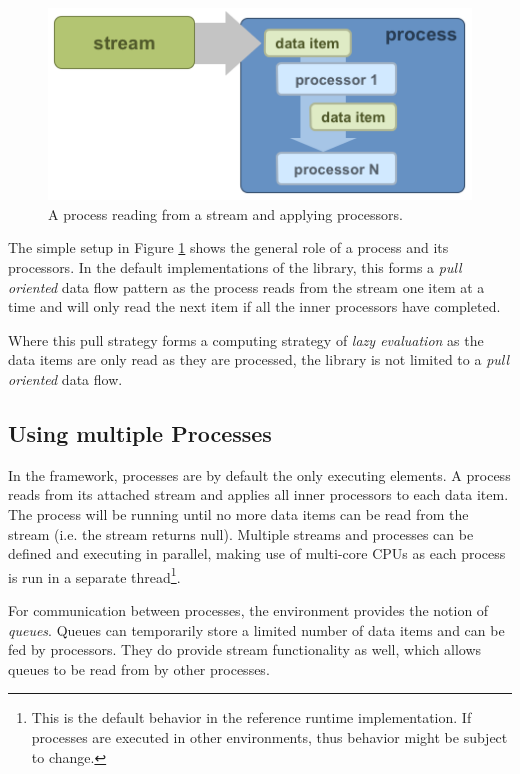 \begin{figure}[h!]
\centering
\includegraphics[scale=0.5]{graphics/inside-process.png}
\caption{\label{fig:process}A process reading from a stream and applying processors.}
\end{figure}

The simple setup in Figure \ref{fig:process} shows the general role of
a process and its processors. In the default implementations of the
\streams library, this forms a {\em pull oriented} data flow pattern
as the process reads from the stream one item at a time and will only
read the next item if all the inner processors have completed. 

Where this pull strategy forms a computing strategy of {\em lazy
  evaluation} as the data items are only read as they are processed,
the \streams library is not limited to a {\em pull oriented} data
flow.


\subsection*{Using multiple Processes}
In the \streams framework, processes are by default the only executing
elements. A process reads from its attached stream and applies all
inner processors to each data item. The process will be running until
no more data items can be read from the stream (i.e. the stream
returns {\ttfamily null}). Multiple streams and processes can be
defined and executing in parallel, making use of multi-core CPUs as
each process is run in a separate thread\footnote{This is the default
  behavior in the reference \streams runtime implementation. If
  \streams processes are executed in other environments, thus behavior
  might be subject to change.}.

For communication between processes, the \streams environment provides
the notion of {\em queues}. Queues can temporarily store a limited
number of data items and can be fed by processors. They do provide
stream functionality as well, which allows queues to be read from by
other processes.

